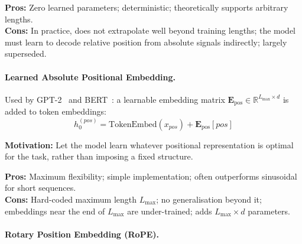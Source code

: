 \textbf{Pros:} Zero learned parameters; deterministic; theoretically supports arbitrary lengths.\\

\textbf{Cons:} In practice, does not extrapolate well beyond training lengths; the model must learn to decode relative position from absolute signals indirectly; largely superseded.

\paragraph{Learned Absolute Positional Embedding.}
\label{learned-absolute-positional-embedding.}

Used by GPT-2~\cite{radford2019gpt2} and BERT~\cite{devlin2019bert}: a learnable embedding matrix $\mathbf{E}_{\text{pos}} \in \mathbb{R}^{L_{\max} \times d}$ is added to token embeddings: 
\[
h_0^{(pos)} = \text{TokenEmbed}(x_{pos}) + \mathbf{E}_{\text{pos}}[pos]
\]

\textbf{Motivation:} Let the model learn whatever positional representation is optimal for the task, rather than imposing a fixed structure.

\textbf{Pros:} Maximum flexibility; simple implementation; often outperforms sinusoidal for short sequences.\\

\textbf{Cons:} Hard-coded maximum length $L_{\max}$; no generalisation beyond it; embeddings near the end of $L_{\max}$ are under-trained; adds $L_{\max} \times d$ parameters.

\paragraph{Rotary Position Embedding (RoPE).}
\label{rotary-position-embedding-rope.}

